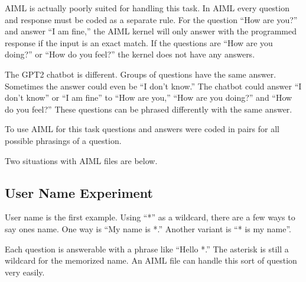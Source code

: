 AIML is actually poorly suited for handling this task. In AIML every question and response must be coded as a separate rule. For the question ``How are you?'' and answer ``I am fine,'' the AIML kernel will only answer with the programmed response if the input is an exact match. If the questions are ``How are you doing?'' or ``How do you feel?'' the kernel does not have any answers. %

The GPT2 chatbot is different. Groups of questions have the same answer. Sometimes the answer could even be ``I don't know.'' The chatbot could answer ``I don't know'' or ``I am fine'' to  ``How are you,''  ``How are you doing?'' and ``How do you feel?'' These questions can be phrased differently with the same answer.

To use AIML for this task questions and answers were coded in pairs for all possible phrasings of a question.



Two situations with AIML files are below.

\subsection{User Name Experiment}
User name is the first example. Using ``*'' as a wildcard, there are a few ways to say ones name. One way is ``My name is *.'' Another variant is ``* is my name''. %

Each question is answerable with a phrase like ``Hello *.'' The asterisk is still a wildcard for the memorized name. An AIML file can handle this sort of question very easily. %

